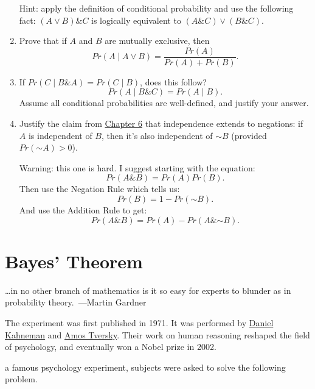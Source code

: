 \documentclass[justified]{tufte-book}
\newcommand{\given}{\mid}
\renewcommand{\neg}{\mathbin{\sim}}
\renewcommand{\wedge}{\mathbin{\&}}
\newcommand{\p}{Pr}
\newenvironment{epigraph}%
{
\begin{flushright}    
\begin{minipage}{20em}
\begin{flushright}
\itshape
}%
{
\end{flushright}
\end{minipage}
\end{flushright}
}
\theoremstyle{definition}
\theoremstyle{definition}
\theoremstyle{definition}
\theoremstyle{remark}
\begin{document}
\begin{enumerate}
  Hint: apply the definition of conditional probability and use the following fact: \((A \vee B) \wedge C\) is logically equivalent to \((A \wedge C) \vee (B \wedge C)\).
\item
  Prove that if \(A\) and \(B\) are mutually exclusive, then
  \[\p(A \given A \vee B) = \frac{ \p(A) }{ \p(A) + \p(B) }.\]
\item
  If \(\p(C \given B \wedge A) = \p(C \given B)\), does this follow?
  \[\p(A \given B \wedge C) = Pr(A \given B).\]
  Assume all conditional probabilities are well-defined, and justify your answer.
\item
  Justify the claim from \protect\hyperlink{declaring-independence}{Chapter 6} that independence extends to negations: if \(A\) is independent of \(B\), then it's also independent of \(\neg B\) (provided \(\p(\neg A) > 0\)).

  Warning: this one is hard. I suggest starting with the equation:
  \[ \p(A \wedge B) = \p(A) \p(B). \]
  Then use the Negation Rule which tells us:
  \[ \p(B) = 1 - \p(\neg B). \]
  And use the Addition Rule to get:
  \[ \p(A \wedge B) = \p(A) - \p(A \wedge \neg B).\]
\end{enumerate}

\hypertarget{chbayes}{%
\chapter{Bayes' Theorem}\label{chbayes}}

\begin{epigraph}
\ldots in no other branch of mathematics is it so easy for experts to blunder as in probability theory.\
---Martin Gardner
\end{epigraph}

\begin{marginfigure}
The experiment was first published in 1971. It was performed by
\href{https://en.wikipedia.org/wiki/Daniel_Kahneman}{Daniel Kahneman}
and \href{https://en.wikipedia.org/wiki/Amos_Tversky}{Amos Tversky}.
Their work on human reasoning reshaped the field of psychology, and
eventually won a Nobel prize in 2002.
\end{marginfigure}

 a famous psychology experiment, subjects were asked to solve the following problem.
\end{document}

